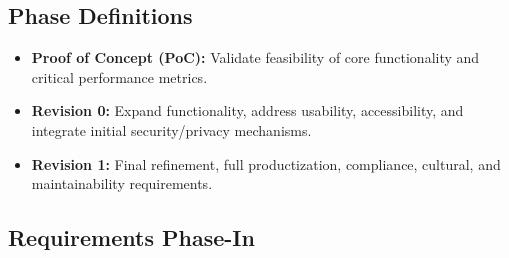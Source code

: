 \documentclass[11pt]{article}
\begin{document}
\subsection{Phase Definitions}

\begin{itemize}
    \item \textbf{Proof of Concept (PoC):} Validate feasibility of core functionality and critical performance metrics.
    \item \textbf{Revision 0:} Expand functionality, address usability, accessibility, and integrate initial security/privacy mechanisms.
    \item \textbf{Revision 1:} Final refinement, full productization, compliance, cultural, and maintainability requirements.
\end{itemize}

\subsection{Requirements Phase-In}
\end{document}
